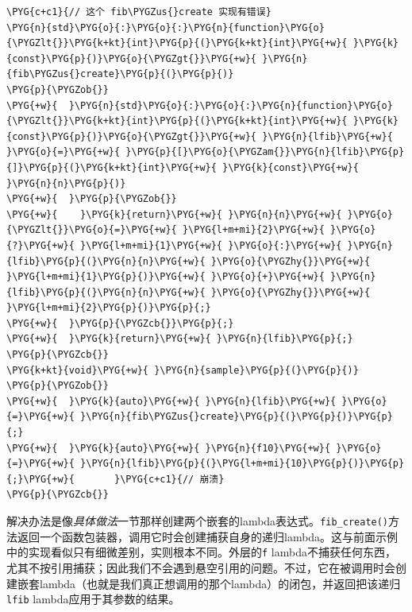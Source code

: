 
\begin{codeblockbg}
\begin{Verbatim}[commandchars=\\\{\},breaklines=true,breakanywhere=true,fontsize=\codefont,xleftmargin=17bp]
\PYG{c+c1}{// 这个 fib\PYGZus{}create 实现有错误}
\PYG{n}{std}\PYG{o}{:}\PYG{o}{:}\PYG{n}{function}\PYG{o}{\PYGZlt{}}\PYG{k+kt}{int}\PYG{p}{(}\PYG{k+kt}{int}\PYG{+w}{ }\PYG{k}{const}\PYG{p}{)}\PYG{o}{\PYGZgt{}}\PYG{+w}{ }\PYG{n}{fib\PYGZus{}create}\PYG{p}{(}\PYG{p}{)}
\PYG{p}{\PYGZob{}}
\PYG{+w}{  }\PYG{n}{std}\PYG{o}{:}\PYG{o}{:}\PYG{n}{function}\PYG{o}{\PYGZlt{}}\PYG{k+kt}{int}\PYG{p}{(}\PYG{k+kt}{int}\PYG{+w}{ }\PYG{k}{const}\PYG{p}{)}\PYG{o}{\PYGZgt{}}\PYG{+w}{ }\PYG{n}{lfib}\PYG{+w}{ }\PYG{o}{=}\PYG{+w}{ }\PYG{p}{[}\PYG{o}{\PYGZam{}}\PYG{n}{lfib}\PYG{p}{]}\PYG{p}{(}\PYG{k+kt}{int}\PYG{+w}{ }\PYG{k}{const}\PYG{+w}{ }\PYG{n}{n}\PYG{p}{)}
\PYG{+w}{  }\PYG{p}{\PYGZob{}}
\PYG{+w}{    }\PYG{k}{return}\PYG{+w}{ }\PYG{n}{n}\PYG{+w}{ }\PYG{o}{\PYGZlt{}}\PYG{o}{=}\PYG{+w}{ }\PYG{l+m+mi}{2}\PYG{+w}{ }\PYG{o}{?}\PYG{+w}{ }\PYG{l+m+mi}{1}\PYG{+w}{ }\PYG{o}{:}\PYG{+w}{ }\PYG{n}{lfib}\PYG{p}{(}\PYG{n}{n}\PYG{+w}{ }\PYG{o}{\PYGZhy{}}\PYG{+w}{ }\PYG{l+m+mi}{1}\PYG{p}{)}\PYG{+w}{ }\PYG{o}{+}\PYG{+w}{ }\PYG{n}{lfib}\PYG{p}{(}\PYG{n}{n}\PYG{+w}{ }\PYG{o}{\PYGZhy{}}\PYG{+w}{ }\PYG{l+m+mi}{2}\PYG{p}{)}\PYG{p}{;}
\PYG{+w}{  }\PYG{p}{\PYGZcb{}}\PYG{p}{;}
\PYG{+w}{  }\PYG{k}{return}\PYG{+w}{ }\PYG{n}{lfib}\PYG{p}{;}
\PYG{p}{\PYGZcb{}}
\PYG{k+kt}{void}\PYG{+w}{ }\PYG{n}{sample}\PYG{p}{(}\PYG{p}{)}
\PYG{p}{\PYGZob{}}
\PYG{+w}{  }\PYG{k}{auto}\PYG{+w}{ }\PYG{n}{lfib}\PYG{+w}{ }\PYG{o}{=}\PYG{+w}{ }\PYG{n}{fib\PYGZus{}create}\PYG{p}{(}\PYG{p}{)}\PYG{p}{;}
\PYG{+w}{  }\PYG{k}{auto}\PYG{+w}{ }\PYG{n}{f10}\PYG{+w}{ }\PYG{o}{=}\PYG{+w}{ }\PYG{n}{lfib}\PYG{p}{(}\PYG{l+m+mi}{10}\PYG{p}{)}\PYG{p}{;}\PYG{+w}{       }\PYG{c+c1}{// 崩溃}
\PYG{p}{\PYGZcb{}}
\end{Verbatim}
\end{codeblockbg}



解决办法是像\textit{具体做法}一节那样创建两个嵌套的lambda表达式。\texttt{fib\_\allowbreak{}create()}方法返回一个函数包装器，调用它时会创建捕获自身的递归lambda。这与前面示例中的实现看似只有细微差别，实则根本不同。外层的\texttt{f} lambda不捕获任何东西，尤其不按引用捕获；因此我们不会遇到悬空引用的问题。不过，它在被调用时会创建嵌套lambda（也就是我们真正想调用的那个lambda）的闭包，并返回把该递归\texttt{lfib} lambda应用于其参数的结果。


